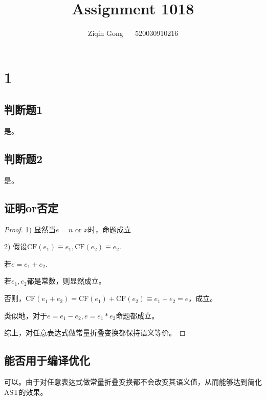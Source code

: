 \documentclass[12pt]{article}
\title{Assignment 1018}
\author{Ziqin Gong $\quad$ 520030910216}
\date{}
\begin{document}
  \maketitle

  \section*{1}

    \subsection{判断题1}
    
      是。

    \subsection{判断题2}

      是。

    \subsection{证明or否定}

      \begin{proof}

        1) 显然当$e = n \textrm{ or } x$时，命题成立

        2) 假设$\textrm{CF}(e_1) \equiv e_1, \textrm{CF}(e_2) \equiv e_2$.

           若$e=e_1+e_2$.

             若$e_1,e_2$都是常数，则显然成立。

             否则，$\textrm{CF}(e_1+e_2) = \textrm{CF}(e_1)+\textrm{CF}(e_2) \equiv e_1 + e_2 = e$，成立。

          类似地，对于$e=e_1 - e_2, e = e_1 * e_2$命题都成立。

        综上，对任意表达式做常量折叠变换都保持语义等价。
      \end{proof}

    \subsection{能否用于编译优化}

      可以。由于对任意表达式做常量折叠变换都不会改变其语义值，从而能够达到简化AST的效果。
\end{document}
